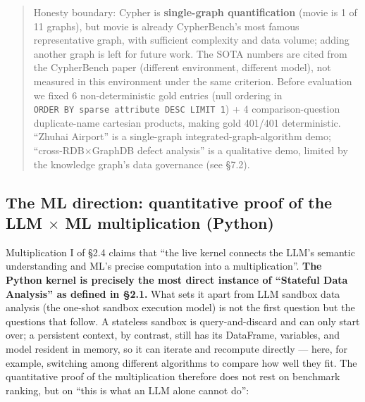 \documentclass[11pt]{article}
\begin{document}
\begin{quote}
Honesty boundary: Cypher is \textbf{single-graph quantification} (movie is 1 of 11 graphs), but movie is already CypherBench's most famous representative graph, with sufficient complexity and data volume; adding another graph is left for future work. The SOTA numbers are cited from the CypherBench paper (different environment, different model), not measured in this environment under the same criterion. Before evaluation we fixed 6 non-deterministic gold entries (null ordering in \texttt{ORDER\ BY\ sparse\ attribute\ DESC\ LIMIT\ 1}) + 4 comparison-question duplicate-name cartesian products, making gold 401/401 deterministic. ``Zhuhai Airport'' is a single-graph integrated-graph-algorithm demo; ``cross-RDB$\times$GraphDB defect analysis'' is a qualitative demo, limited by the knowledge graph's data governance (see \S{}7.2).
\end{quote}

\subsection{The ML direction: quantitative proof of the LLM $\times$ ML multiplication (Python)}

Multiplication I of \S{}2.4 claims that ``the live kernel connects the LLM's semantic understanding and ML's precise computation into a multiplication''. \textbf{The Python kernel is precisely the most direct instance of ``Stateful Data Analysis'' as defined in \S{}2.1.} What sets it apart from LLM sandbox data analysis (the one-shot sandbox execution model) is not the first question but the questions that follow. A stateless sandbox is query-and-discard and can only start over; a persistent context, by contrast, still has its DataFrame, variables, and model resident in memory, so it can iterate and recompute directly --- here, for example, switching among different algorithms to compare how well they fit. The quantitative proof of the multiplication therefore does not rest on benchmark ranking, but on ``this is what an LLM alone cannot do'':
\end{document}

